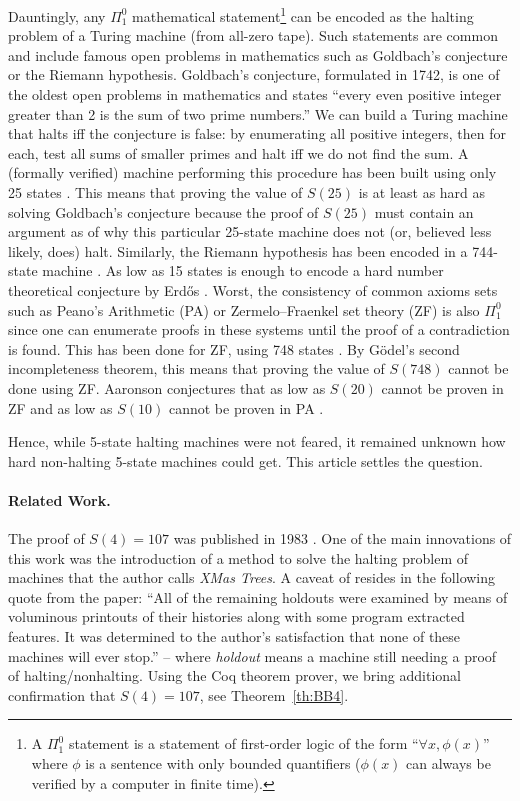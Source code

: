 \documentclass[a4paper,british]{article}
\theoremstyle{definition} %
\numberwithin{equation}{section}
\theoremstyle{definition} %
\newcommand{\BBtheFourth}{107}
\begin{document}
Dauntingly, any $\Pi_1^0$ mathematical statement\footnote{A $\Pi_1^0$ statement is a statement of first-order logic of the form ``$\forall x, \phi(x)$'' where $\phi$ is a sentence with only bounded quantifiers (\ie $\phi(x)$ can always be verified by a computer in finite time).} can be encoded as the halting problem of a Turing machine (from all-zero tape). Such statements are common and include famous open problems in mathematics such as Goldbach's conjecture or the Riemann hypothesis. Goldbach's conjecture, formulated in 1742, is one of the oldest open problems in mathematics and states ``every even positive integer greater than 2 is the sum of two prime numbers.'' We can build a Turing machine that halts iff the conjecture is false: by enumerating all positive integers, then for each, test all sums of smaller primes and halt iff we do not find the sum. A (formally verified) machine performing this procedure has been built using only 25 states \cite{GoldbachTM27, GoldbachTM25}. This means that proving the value of $S(25)$ is at least as hard as solving Goldbach's conjecture because the proof of $S(25)$ must contain an argument as of why this particular 25-state machine does not (or, believed less likely, does) halt. Similarly, the Riemann hypothesis has been encoded in a 744-state machine \cite{RiemannTM,Yedidia2016,BusyBeaverFrontier}. As low as 15 states is enough to encode a hard number theoretical conjecture by Erd\H{o}s \cite{BB15}. Worst, the consistency of common axioms sets such as Peano's Arithmetic (PA) or Zermelo–Fraenkel set theory (ZF) is also $\Pi_1^0$ since one can enumerate proofs in these systems until the proof of a contradiction is found. This has been done for ZF, using 748 states \cite{ZFTM,Yedidia2016,BusyBeaverFrontier,BB748Thesis}. By G\"odel's second incompleteness theorem, this means that proving the value of $S(748)$ cannot be done using ZF. Aaronson conjectures that as low as $S(20)$ cannot be proven in ZF and as low as $S(10)$ cannot be proven in PA \cite{BusyBeaverFrontier}.

Hence, while 5-state halting machines were not feared, it remained unknown how hard non-halting 5-state machines could get. This article settles the question.

\paragraph{Related Work.} The proof of $S(4) = \BBtheFourth$ was published in 1983 \cite{Brady83}. One of the main innovations of this work was the introduction of a method to solve the halting problem of machines that the author calls \textit{XMas Trees}.  A caveat of \cite{Brady83} resides in the following quote from the paper: ``All of the remaining holdouts were examined by means of voluminous printouts of their histories along with some program extracted features. It was determined to the author's satisfaction that none of these machines will ever stop.'' -- where \textit{holdout} means a machine still needing a proof of halting/nonhalting. Using the Coq theorem prover, we bring additional confirmation that $S(4) = \BBtheFourth$, see Theorem~\ref{th:BB4}.
\end{document}
